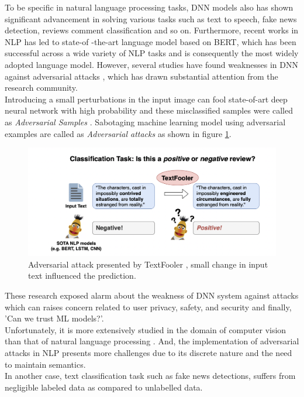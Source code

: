 \documentclass[%
	BCOR=8mm, %
	DIV=12, 
	toc=bibliography, %
	toc=listof, %
	oneside, %
	egregdoesnotlikesansseriftitles, %
	]{scrbook}
\begin{document}
To be specific in natural language processing tasks, DNN  models also has shown significant advancement in solving various tasks such as text to speech, fake news detection, 
reviews comment classification and so on. Furthermore, recent works \cite{devlin_bert_2019,liu_roberta_2019,sanh_distilbert_2020,lan_albert_2020} in NLP has led to state-of
-the-art language model based on BERT, which has been successful across a wide variety of NLP tasks and is consequently the most widely adopted language model. However, 
several studies have found weaknesses in DNN  against adversarial attacks \cite{szegedy_intriguing_2014,yuan_adversarial_2018,akhtar_threat_2018,huq_adversarial_2020,
zhang_adversarial_2019}, which has drawn substantial attention from the research community. \\ 
Introducing a small perturbations in the input image can fool state-of-art deep neural network with high probability and these misclassified samples were called as
 \textit{Adversarial Samples} \cite{szegedy_intriguing_2014}. Sabotaging machine learning model using adversarial examples are called as \textit{Adversarial attacks} as shown 
 in figure \ref{diag:ExampleAdversarial}. 

\begin{figure}[h!]
\centering
\includegraphics[width=.97\textwidth]{img/Introduction-Fig-1.png}
\caption[Adversarial Example]{Adversarial attack presented by TextFooler \cite{jin_is_2020}, small change in input text influenced the prediction.}
\label{diag:ExampleAdversarial}
\end{figure}

These research exposed alarm about the weakness of DNN system against attacks which can raises concern related to user privacy, safety, and security and finally, 'Can we trust ML models?'.\\
Unfortunately, it is more extensively studied in the domain of computer vision than that of natural language processing \cite{wang_towards_2021}. And, the implementation of adversarial 
attacks in NLP presents more challenges due to its discrete nature and the need to maintain semantics\cite{li_bert-attack_2020}. \\
In another case, text classification task such as fake news detections, suffers from negligible labeled data as compared to unlabelled data. 
\end{document}
